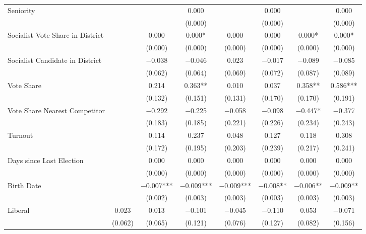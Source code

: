 \begin{table}[!h]
{\begin{threeparttable}
\begin{tabular}[t]{lccccccc}
Seniority &  &  & \num{0.000} &  & \num{0.000} &  & \num{0.000}\\
 &  &  & (\num{0.000}) &  & (\num{0.000}) &  & (\num{0.000})\\
Socialist Vote Share in District &  & \num{0.000} & \num{0.000}* & \num{0.000} & \num{0.000} & \num{0.000}* & \num{0.000}*\\
 &  & (\num{0.000}) & (\num{0.000}) & (\num{0.000}) & (\num{0.000}) & (\num{0.000}) & \vphantom{1} (\num{0.000})\\
Socialist Candidate in District &  & \num{-0.038} & \num{-0.046} & \num{0.023} & \num{-0.017} & \num{-0.089} & \num{-0.085}\\
 &  & (\num{0.062}) & (\num{0.064}) & (\num{0.069}) & (\num{0.072}) & (\num{0.087}) & (\num{0.089})\\
Vote Share &  & \num{0.214} & \num{0.363}** & \num{0.010} & \num{0.037} & \num{0.358}** & \num{0.586}***\\
 &  & (\num{0.132}) & (\num{0.151}) & (\num{0.131}) & (\num{0.170}) & (\num{0.170}) & (\num{0.191})\\
Vote Share Nearest Competitor &  & \num{-0.292} & \num{-0.225} & \num{-0.058} & \num{-0.098} & \num{-0.447}* & \num{-0.377}\\
 &  & (\num{0.183}) & (\num{0.185}) & (\num{0.221}) & (\num{0.226}) & (\num{0.234}) & (\num{0.243})\\
Turnout &  & \num{0.114} & \num{0.237} & \num{0.048} & \num{0.127} & \num{0.118} & \num{0.308}\\
 &  & (\num{0.172}) & (\num{0.195}) & (\num{0.203}) & (\num{0.239}) & (\num{0.217}) & (\num{0.241})\\
Days since Last Election &  & \num{0.000} & \num{0.000} & \num{0.000} & \num{0.000} & \num{0.000} & \num{0.000}\\
 &  & (\num{0.000}) & (\num{0.000}) & (\num{0.000}) & (\num{0.000}) & (\num{0.000}) & (\num{0.000})\\
Birth Date &  & \num{-0.007}*** & \num{-0.009}*** & \num{-0.009}*** & \num{-0.008}** & \num{-0.006}** & \num{-0.009}**\\
 &  & (\num{0.002}) & (\num{0.003}) & (\num{0.003}) & (\num{0.003}) & (\num{0.003}) & (\num{0.003})\\
Liberal & \num{0.023} & \num{0.013} & \num{-0.101} & \num{-0.045} & \num{-0.110} & \num{0.053} & \num{-0.071}\\
 & (\num{0.062}) & (\num{0.065}) & (\num{0.121}) & (\num{0.076}) & (\num{0.127}) & (\num{0.082}) & (\num{0.156})\\

\end{tabular}
\end{threeparttable}}
\end{table}
